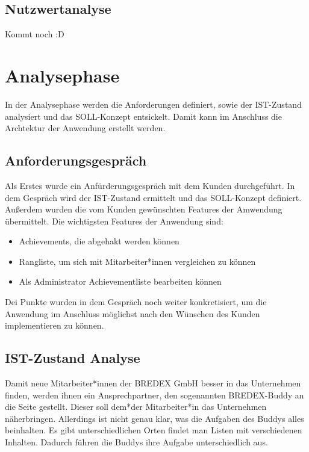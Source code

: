 \documentclass[12pt]{article}
\begin{document}
\subsection{Nutzwertanalyse}

Kommt noch :D



%
%

\section{Analysephase}
In der Analysephase werden die Anforderungen definiert, sowie der IST-Zustand analysiert und das
SOLL-Konzept entsickelt. Damit kann im Anschluss die Archtektur der Anwendung erstellt werden.

\subsection{Anforderungsgespräch}
Als Erstes wurde ein Anfürderungsgespräch mit dem Kunden durchgeführt.
In dem Gespräch wird der IST-Zustand ermittelt und das SOLL-Konzept definiert.
Außerdem wurden die vom Kunden gewünschten Features der Amwendung übermittelt.
Die wichtigsten Features der Anwendung sind:

\begin{itemize}
    \item Achievements, die abgehakt werden können
    \item Rangliste, um sich mit Mitarbeiter*innen vergleichen zu können
    \item Als Administrator Achievementliste bearbeiten können 
\end{itemize}

Dei Punkte wurden in dem Gespräch noch weiter konkretisiert, um die Anwendung
im Anschluss möglichst nach den Wünschen des Kunden implementieren zu können.


\subsection{IST-Zustand Analyse}

Damit neue Mitarbeiter*innen der BREDEX GmbH besser in das Unternehmen
finden, werden ihnen ein Ansprechpartner, den sogenannten BREDEX-Buddy
an die Seite gestellt. Dieser soll dem*der Mitarbeiter*in das Unternehmen
näherbringen. Allerdings ist nicht genau klar, was die Aufgaben des Buddys
alles beinhalten. Es gibt unterschiedlichen Orten findet man Listen mit
verschiedenen Inhalten. 
Dadurch führen die Buddys ihre Aufgabe unterschiedlich aus.
\end{document}
